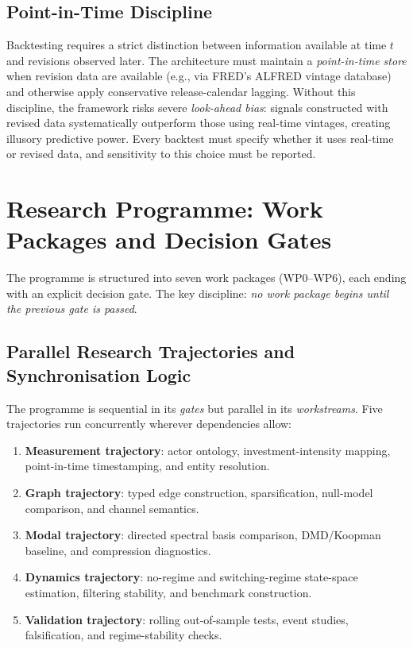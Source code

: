 \documentclass[11pt,a4paper]{article}
\theoremstyle{definition}
\begin{document}
\subsection{Point-in-Time Discipline}

Backtesting requires a strict distinction between information available at time $t$ and revisions observed later. The architecture must maintain a \emph{point-in-time store} when revision data are available (e.g., via FRED's ALFRED vintage database) and otherwise apply conservative release-calendar lagging. Without this discipline, the framework risks severe \emph{look-ahead bias}: signals constructed with revised data systematically outperform those using real-time vintages, creating illusory predictive power. Every backtest must specify whether it uses real-time or revised data, and sensitivity to this choice must be reported.


\section{Research Programme: Work Packages and Decision Gates}
\label{sec:wp}

The programme is structured into seven work packages (WP0--WP6), each ending with an explicit decision gate. The key discipline: \emph{no work package begins until the previous gate is passed}.

\subsection{Parallel Research Trajectories and Synchronisation Logic}
\label{sec:trajectories}

The programme is sequential in its \emph{gates} but parallel in its \emph{workstreams}. Five trajectories run concurrently wherever dependencies allow:
\begin{enumerate}[label=\textbf{T\arabic*:},leftmargin=2.2em,nosep]
  \item \textbf{Measurement trajectory}: actor ontology, investment-intensity mapping, point-in-time timestamping, and entity resolution.
  \item \textbf{Graph trajectory}: typed edge construction, sparsification, null-model comparison, and channel semantics.
  \item \textbf{Modal trajectory}: directed spectral basis comparison, DMD/Koopman baseline, and compression diagnostics.
  \item \textbf{Dynamics trajectory}: no-regime and switching-regime state-space estimation, filtering stability, and benchmark construction.
  \item \textbf{Validation trajectory}: rolling out-of-sample tests, event studies, falsification, and regime-stability checks.
\end{enumerate}
\end{document}
